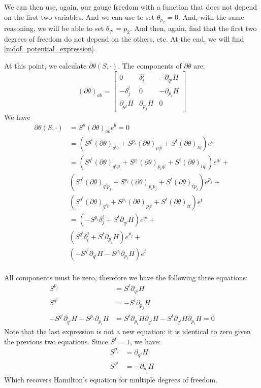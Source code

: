 \documentclass[10pt,twocolumn, nofootinbib]{revtex4-2}
\begin{document}
We can then use, again, our gauge freedom with a function that does not depend on the first two variables. And we can use to set $\theta_{p_2} = 0$. And, with the same reasoning, we will be able to set $\theta_{q^2} = p_2$. And then, again, find that the first two degrees of freedom do not depend on the others, etc. At the end, we will find \ref{mdof_potential_expression}.

At this point, we calculate $\partial\theta(S, \cdot ) $. The components of $\partial\theta$ are:
\begin{equation*}
	(\partial\theta)_{ab} = \begin{bmatrix}
		0 & \delta^j_i & - \partial_{q^i} H \\
		-\delta^i_j & 0 & - \partial_{p_i} H \\
		\partial_{q^j} H & \partial_{p_j} H & 0
	\end{bmatrix}
\end{equation*}
We have
\begin{align*}
	\partial\theta(S, \cdot )  &= S^a (\partial\theta)_{ab} e^b = 0 \\
	&= (S^{q^i}(\partial\theta)_{q^ib} + S^{p_i}(\partial\theta)_{p_ib} + S^{t}(\partial\theta)_{tb}) e^b \\
	&= (S^{q^i}(\partial\theta)_{q^iq^j} + S^{p_i}(\partial\theta)_{p_iq^j} + S^{t}(\partial\theta)_{tq^j}) e^{q^j} + \\
	& (S^{q^i}(\partial\theta)_{q^ip_j} +  S^{p_i}(\partial\theta)_{p_ip_j} + S^{t}(\partial\theta)_{tp_j}) e^{p_j} + \\
	& (S^{q^i}(\partial\theta)_{q^it} + S^{p_i}(\partial\theta)_{p_it} + S^{t}(\partial\theta)_{tt}) e^t \\
	&= (-S^{p_i}\delta^i_j + S^{t}\partial_{q^j} H ) e^{q^j} + \\
	& (S^{q^i}\delta^j_i +  S^{t}\partial_{p_j} H) e^{p_j} + \\
	& (-S^{q^i} \partial_{q^i} H - S^{p_i} \partial_{p_i} H) e^t \\
\end{align*}

All components must be zero, therefore we have the following three equations:
\begin{align*}
	S^{p_j} &= S^{t} \partial_{q^j} H \\
	S^{q^j} &= - S^{t}\partial_{p_j} H \\
	-S^{q^i} \partial_{q^i} H - S^{p_i} \partial_{p_i} H &= S^{t}\partial_{p_i} H \partial_{q^i} H - S^{t} \partial_{q^i} H \partial_{p_i} H = 0
\end{align*}
Note that the last expression is not a new equation: it is identical to zero given the previous two equations. Since $S^t = 1$, we have:
\begin{align*}
	S^{p_j} &= \partial_{q^j} H \\
	S^{q^j} &= - \partial_{p_j} H
\end{align*}
Which recovers Hamilton's equation for multiple degrees of freedom.
\end{document}
